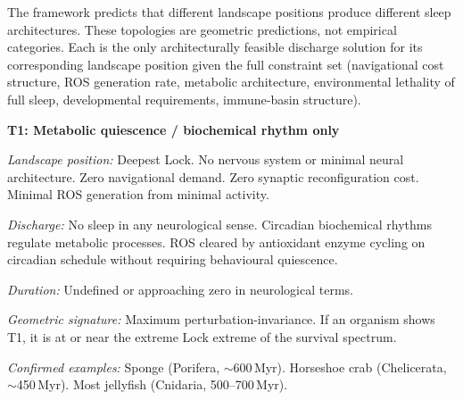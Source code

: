 \documentclass[10pt, a4paper]{article}
\begin{document}
The framework predicts that different
landscape positions produce different
sleep architectures. These topologies
are geometric predictions, not empirical
categories. Each is the only
architecturally feasible discharge
solution for its corresponding
landscape position given the full
constraint set (navigational cost
structure, ROS generation rate, metabolic
architecture, environmental lethality
of full sleep, developmental requirements,
immune-basin structure).

\begin{mdframed}[
  backgroundcolor=topologybox,
  linecolor=headergreen,
  linewidth=0.8pt,
  innertopmargin=0.6em,
  innerbottommargin=0.6em,
  innerleftmargin=0.8em,
  innerrightmargin=0.8em
]
\textbf{T1: Metabolic quiescence /
biochemical rhythm only}

\textit{Landscape position:} Deepest Lock.
No nervous system or minimal neural
architecture. Zero navigational demand.
Zero synaptic reconfiguration cost.
Minimal ROS generation from minimal
activity.

\textit{Discharge:} No sleep in any
neurological sense. Circadian biochemical
rhythms regulate metabolic processes.
ROS cleared by antioxidant enzyme cycling
on circadian schedule without requiring
behavioural quiescence.

\textit{Duration:} Undefined or
approaching zero in neurological terms.

\textit{Geometric signature:} Maximum
perturbation-invariance. If an organism
shows T1, it is at or near the extreme
Lock extreme of the survival spectrum.

\textit{Confirmed examples:} Sponge
(Porifera, $\sim$600\,Myr). Horseshoe
crab (Chelicerata, $\sim$450\,Myr).
Most jellyfish (Cnidaria, 500--700\,Myr).
\end{mdframed}

\vspace{0.4em}
\end{document}
